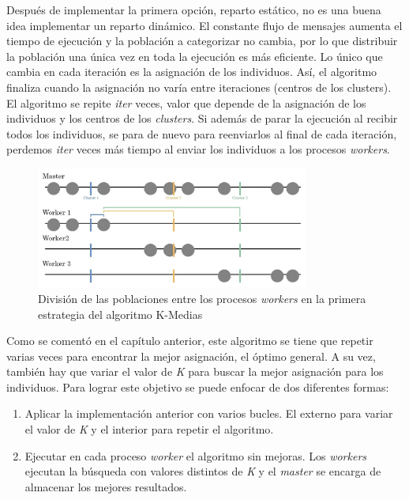 	
		
		Después de implementar la primera opción, reparto estático, no es una buena idea implementar un reparto dinámico. El constante flujo de mensajes aumenta el tiempo de ejecución y la población a categorizar no cambia, por lo que distribuir la población una única vez en toda la ejecución es más eficiente. Lo único que cambia en cada iteración es la asignación de los individuos. Así, el algoritmo finaliza cuando la asignación no varía entre iteraciones (centros de los clusters). El algoritmo se repite \textit{iter} veces, valor que depende de la asignación de los individuos y los centros de los \textit{clusters}. Si además de parar la ejecución al recibir todos los individuos, se para de nuevo para reenviarlos al final de cada iteración, perdemos \textit{iter} veces más tiempo al enviar los individuos a los procesos \textit{workers}. 
		
		
		\begin{figure} [!h]
			\centering
			\includegraphics[width=0.8\textwidth]{images/chapter_3/kmedias_mpi}	
			\caption{División de las poblaciones entre los procesos \textit{workers} en la primera estrategia del algoritmo K-Medias}
			\label{fig:kmediasdiv}
		\end{figure}
		
		
		
		Como se comentó en el capítulo anterior, este algoritmo se tiene que repetir varias veces para encontrar la mejor asignación, el óptimo general. A su vez, también hay que variar el valor de \textit{K} para buscar la mejor asignación para los individuos. Para lograr este objetivo se puede enfocar de dos diferentes formas:
		
		\begin{enumerate}
			\item Aplicar la implementación anterior con varios bucles. El externo para variar el valor de \textit{K} y el interior para repetir el algoritmo.
			\item Ejecutar en cada proceso \textit{worker} el algoritmo sin mejoras. Los \textit{workers} ejecutan la búsqueda con valores distintos de \textit{K} y el \textit{master} se encarga de almacenar los mejores resultados.
		\end{enumerate}
		
